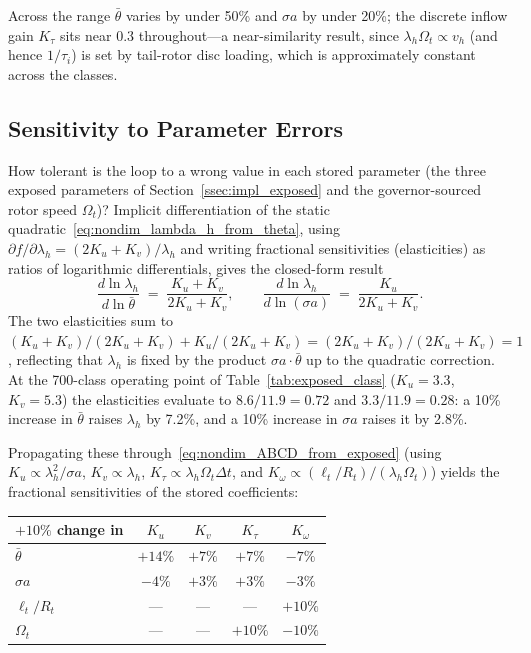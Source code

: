 \documentclass[11pt,a4paper]{article}
\newcommand{\OmegaT}{\Omega_t}
\newcommand{\Rt}{R_t}
\newcommand{\btheta}{\bar{\theta}}
\begin{document}
Across the range \(\btheta\) varies by under 50\% and \(\sigma a\)
by under 20\%; the discrete inflow gain \(K_\tau\) sits near 0.3
throughout---a near-similarity result, since
\(\lambda_h\OmegaT\propto v_h\) (and hence \(1/\tau_i\)) is set by
tail-rotor disc loading, which is approximately constant across the
classes.

\subsection{Sensitivity to Parameter Errors}\label{ssec:param_sensitivity}

How tolerant is the loop to a wrong value in each stored parameter
(the three exposed parameters of Section~\ref{ssec:impl_exposed} and
the governor-sourced rotor speed \(\OmegaT\))?
Implicit differentiation of the static
quadratic~\eqref{eq:nondim_lambda_h_from_theta}, using
\(\partial f/\partial\lambda_h = (2K_u+K_v)/\lambda_h\) and writing
fractional sensitivities (elasticities) as ratios of logarithmic
differentials, gives the closed-form result
\begin{equation}
\frac{d\ln\lambda_h}{d\ln\btheta} \;=\; \frac{K_u+K_v}{2K_u+K_v},
\qquad
\frac{d\ln\lambda_h}{d\ln(\sigma a)} \;=\; \frac{K_u}{2K_u+K_v}.
\label{eq:lambda_elasticity}
\end{equation}
The two elasticities sum to
\((K_u+K_v)/(2K_u+K_v) + K_u/(2K_u+K_v) = (2K_u+K_v)/(2K_u+K_v) = 1\), reflecting that
\(\lambda_h\) is fixed by the product \(\sigma a\cdot\btheta\) up to
the quadratic correction. At the 700-class operating point of
Table~\ref{tab:exposed_class} (\(K_u=3.3\), \(K_v=5.3\)) the elasticities
evaluate to \(8.6/11.9=0.72\) and \(3.3/11.9=0.28\): a 10\% increase
in \(\btheta\) raises \(\lambda_h\) by 7.2\%, and a 10\% increase in
\(\sigma a\) raises it by 2.8\%.

Propagating these through~\eqref{eq:nondim_ABCD_from_exposed} (using
\(K_u\propto\lambda_h^2/\sigma a\), \(K_v\propto\lambda_h\),
\(K_\tau\propto\lambda_h\OmegaT\Delta t\), and
\(K_\omega\propto(\ell_t/\Rt)/(\lambda_h\OmegaT)\)) yields the fractional
sensitivities of the stored coefficients:

\begin{center}
\renewcommand{\arraystretch}{1.2}
\begin{tabular}{lcccc}
\toprule
\(+10\%\) change in   & \(K_u\)      & \(K_v\)     & \(K_\tau\)     & \(K_\omega\)      \\
\midrule
\(\btheta\)           & \(+14\%\)  & \(+7\%\)  & \(+7\%\)  & \(-7\%\)   \\
\(\sigma a\)          & \(-4\%\)   & \(+3\%\)  & \(+3\%\)  & \(-3\%\)   \\
\(\ell_t/\Rt\)        & ---        & ---       & ---       & \(+10\%\)  \\
\(\OmegaT\)           & ---        & ---       & \(+10\%\) & \(-10\%\)  \\
\bottomrule
\end{tabular}
\end{center}
\end{document}
